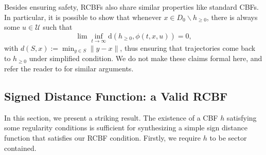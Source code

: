 \documentclass[letterpaper, 10 pt, conference]{ieeeconf}
\newtheorem{theorem}{Theorem}
\newtheorem{remark}{Remark}
\newcommand{\x}{\mathbf{x}}
\newcommand{\X}{\mathcal{X}}
\newcommand{\U}{\mathcal{U}}
\begin{document}


    

Besides ensuring safety, RCBFs also share similar properties like standard CBFs. In particular, it is possible to show that whenever $x\in D_0\backslash h_{\ge0}$, there is always some $u\in\U$ such that 
$$\lim\inf_{t\rightarrow\infty} \mathrm{d}(h_{\geq0},\phi(t,x,u))=0,$$
with $d(S,x):=\min_{y\in S}\|y-x\|$, thus ensuring that trajectories come back to $h_{\geq0}$ under simplified condition. We do not make these claims formal here, and refer the reader to \cite{ssm2024allerton} for similar arguments.

\subsection{Signed Distance Function: a Valid RCBF}
\label{Sec: Validity}
In this section, we present a striking result. The existence of a CBF $h$ satisfying some regularity conditions is sufficient for synthesizing a simple sign distance function that satisfies our RCBF condition. Firstly, we require $h$ to be sector contained.
\end{document}
